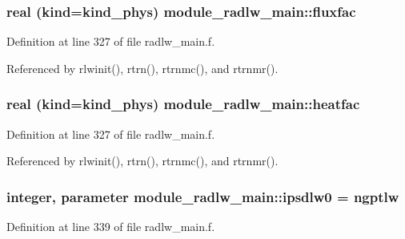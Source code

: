 \subsubsection[{\texorpdfstring{fluxfac}{fluxfac}}]{\setlength{\rightskip}{0pt plus 5cm}real (kind=kind\+\_\+phys) module\+\_\+radlw\+\_\+main\+::fluxfac\hspace{0.3cm}{\ttfamily [private]}}\hypertarget{namespacemodule__radlw__main_a3c31da677e01139d9a3f1e0795a0b614}{}\label{namespacemodule__radlw__main_a3c31da677e01139d9a3f1e0795a0b614}


Definition at line 327 of file radlw\+\_\+main.\+f.



Referenced by rlwinit(), rtrn(), rtrnmc(), and rtrnmr().

\subsubsection[{\texorpdfstring{heatfac}{heatfac}}]{\setlength{\rightskip}{0pt plus 5cm}real (kind=kind\+\_\+phys) module\+\_\+radlw\+\_\+main\+::heatfac\hspace{0.3cm}{\ttfamily [private]}}\hypertarget{namespacemodule__radlw__main_a75ff8e29e21f0d07684d4a09c744daec}{}\label{namespacemodule__radlw__main_a75ff8e29e21f0d07684d4a09c744daec}


Definition at line 327 of file radlw\+\_\+main.\+f.



Referenced by rlwinit(), rtrn(), rtrnmc(), and rtrnmr().

\subsubsection[{\texorpdfstring{ipsdlw0}{ipsdlw0}}]{\setlength{\rightskip}{0pt plus 5cm}integer, parameter module\+\_\+radlw\+\_\+main\+::ipsdlw0 = ngptlw\hspace{0.3cm}{\ttfamily [private]}}\hypertarget{namespacemodule__radlw__main_a9b634a4f7b06ffdd919de69a165edadc}{}\label{namespacemodule__radlw__main_a9b634a4f7b06ffdd919de69a165edadc}


Definition at line 339 of file radlw\+\_\+main.\+f.



